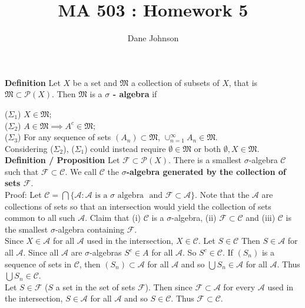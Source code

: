 \documentclass[a4paper]{article}
\title{MA 503 : Homework 5}
\author{Dane Johnson}
\begin{document}
\maketitle


{\bf Definition} Let $X$ be a set and $\mathfrak{M}$ a collection of subsets of $X$, that is $\mathfrak{M} \subset \mathcal{P}(X)$. Then $\mathfrak{M}$ is a {\bf $\sigma$ - algebra} if

($\Sigma_1$) $X \in \mathfrak{M}$;\\
($\Sigma_2$) $A \in \mathfrak{M} \implies A^c \in \mathfrak{M}$;\\
($\Sigma_3$) For any sequence of sets $(A_n)\subset \mathfrak{M}$, $\cup_{n=1}^\infty A_n \in \mathfrak{M}$.\\

Considering ($\Sigma_2$), ($\Sigma_1$) could instead require $\emptyset \in \mathfrak{M}$ or both $\emptyset, X \in \mathfrak{M}$. \\

{\bf Definition / Proposition} Let $\mathcal{F} \subset \mathcal{P}(X)$. There is a smallest $\sigma$-algebra $\mathcal{C}$ such that $\mathcal{F} \subset \mathcal{C}$. We call $\mathcal{C}$ the {\bf $\sigma$-algebra generated by the collection of sets $\mathcal{F}$}. \\

Proof: Let $\mathcal{C} = \bigcap\{\mathcal{A} : \mathcal{A} \text{ is a } \sigma \text{ algebra } \text{ and } \mathcal{F}\subset \mathcal{A}\}$. Note that the $\mathcal{A}$ are collections of sets so that an intersection would yield the collection of sets common to all such $\mathcal{A}$.  Claim that (i) $\mathcal{C}$ is a $\sigma$-algebra, (ii) $\mathcal{F}\subset \mathcal{C}$ and (iii) $\mathcal{C}$ is the smallest $\sigma$-algebra containing $\mathcal{F}$.\\

Since $X \in \mathcal{A}$ for all $\mathcal{A}$ used in the intersection, $X \in \mathcal{C}$. Let $S \in \mathcal{C}$ Then $S \in \mathcal{A}$ for all $\mathcal{A}$. Since all $\mathcal{A}$ are $\sigma$-algebras $S^c \in A$ for all $\mathcal{A}$. So $S^c \in \mathcal{C}$. If $(S_n)$ is a sequence of sets in $\mathcal{C}$, then $(S_n)\subset \mathcal{A}$ for all $\mathcal{A}$ and so $\bigcup S_n \in \mathcal{A}$ for all $\mathcal{A}$. Thus $\bigcup S_n \in \mathcal{C}$.\\

Let $S \in \mathcal{F}$ ($S$ a set in the set of sets $\mathcal{F}$). Then since $\mathcal{F}\subset \mathcal{A}$ for every $\mathcal{A}$ used in the intersection, $S \in \mathcal{A}$ for all $\mathcal{A}$ and so $S \in \mathcal{C}$. Thus $\mathcal{F}\subset \mathcal{C}$. \\
\end{document}
